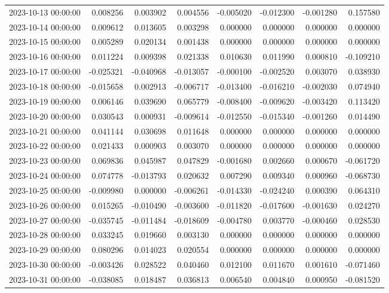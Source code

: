 \begin{tabular}{lrrrrrrr}
2023-10-13 00:00:00 & 0.008256 & 0.003902 & 0.004556 & -0.005020 & -0.012300 & -0.001280 & 0.157580 \\
2023-10-14 00:00:00 & 0.009612 & 0.013605 & 0.003298 & 0.000000 & 0.000000 & 0.000000 & 0.000000 \\
2023-10-15 00:00:00 & 0.005289 & 0.020134 & 0.001438 & 0.000000 & 0.000000 & 0.000000 & 0.000000 \\
2023-10-16 00:00:00 & 0.011224 & 0.009398 & 0.021338 & 0.010630 & 0.011990 & 0.000810 & -0.109210 \\
2023-10-17 00:00:00 & -0.025321 & -0.040968 & -0.013057 & -0.000100 & -0.002520 & 0.003070 & 0.038930 \\
2023-10-18 00:00:00 & -0.015658 & 0.002913 & -0.006717 & -0.013400 & -0.016210 & -0.002030 & 0.074940 \\
2023-10-19 00:00:00 & 0.006146 & 0.039690 & 0.065779 & -0.008400 & -0.009620 & -0.003420 & 0.113420 \\
2023-10-20 00:00:00 & 0.030543 & 0.000931 & -0.009614 & -0.012550 & -0.015340 & -0.001260 & 0.014490 \\
2023-10-21 00:00:00 & 0.041144 & 0.030698 & 0.011648 & 0.000000 & 0.000000 & 0.000000 & 0.000000 \\
2023-10-22 00:00:00 & 0.021433 & 0.000903 & 0.003070 & 0.000000 & 0.000000 & 0.000000 & 0.000000 \\
2023-10-23 00:00:00 & 0.069836 & 0.045987 & 0.047829 & -0.001680 & 0.002660 & 0.000670 & -0.061720 \\
2023-10-24 00:00:00 & 0.074778 & -0.013793 & 0.020632 & 0.007290 & 0.009340 & 0.000960 & -0.068730 \\
2023-10-25 00:00:00 & -0.009980 & 0.000000 & -0.006261 & -0.014330 & -0.024240 & 0.000390 & 0.064310 \\
2023-10-26 00:00:00 & 0.015265 & -0.010490 & -0.003600 & -0.011820 & -0.017600 & -0.001630 & 0.024270 \\
2023-10-27 00:00:00 & -0.035745 & -0.011484 & -0.018609 & -0.004780 & 0.003770 & -0.000460 & 0.028530 \\
2023-10-28 00:00:00 & 0.033245 & 0.019660 & 0.003130 & 0.000000 & 0.000000 & 0.000000 & 0.000000 \\
2023-10-29 00:00:00 & 0.080296 & 0.014023 & 0.020554 & 0.000000 & 0.000000 & 0.000000 & 0.000000 \\
2023-10-30 00:00:00 & -0.003426 & 0.028522 & 0.040460 & 0.012100 & 0.011670 & 0.001610 & -0.071460 \\
2023-10-31 00:00:00 & -0.038085 & 0.018487 & 0.036813 & 0.006540 & 0.004840 & 0.000950 & -0.081520 \\

\end{tabular}
